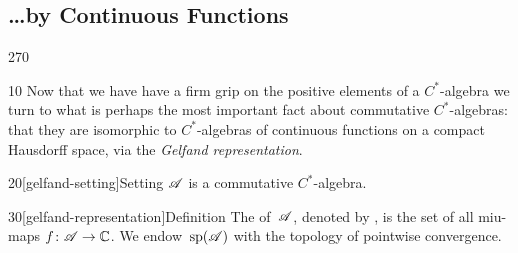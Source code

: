 \subsection{\dots by Continuous Functions}
\begin{parsec}{270}%
\begin{point}{10}%
Now that we have have a firm grip
on the positive elements of a $C^*$-algebra
we turn to what is perhaps the most important
fact about commutative $C^*$-algebras:
that they are isomorphic to $C^*$-algebras
of continuous functions on a compact Hausdorff space,
via the \emph{Gelfand representation}.
\end{point}
\begin{point}{20}[gelfand-setting]{Setting}%
$\mathscr{A}$ is a commutative $C^*$-algebra.
\end{point}
\begin{point}{30}[gelfand-representation]{Definition}%
The  of~$\mathscr{A}$,%
denoted by \Define{$\spec(\scrA)$},
is the set of all miu-maps $f\colon \mathscr{A}\to \mathbb{C}$.
We endow~$\spec(\scrA)$
with the topology of pointwise convergence.


\end{point}
\end{parsec}
